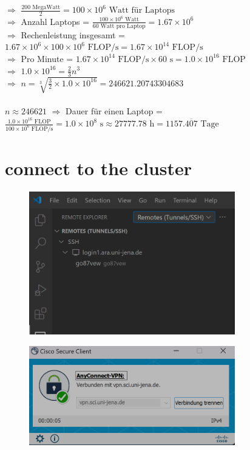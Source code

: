 \documentclass{article}
\begin{document}
$\Rightarrow$  $\frac{200 \text{ MegaWatt}}{2} = 100 \times 10^6 \text{ Watt für Laptops}$\\
$\Rightarrow$  Anzahl Laptops = $\frac{100 \times 10^6 \text{ Watt}}{60 \text{ Watt pro Laptop}} = 1.67 \times 10^6$\\
$\Rightarrow$  Rechenleistung insgesamt = $1.67 \times 10^6 \times 100 \times 10^6\text{ FLOP/s} = 1.67 \times 10^{14} \text{ FLOP/s}$\\
$\Rightarrow$  Pro Minute = $1.67 \times 10^{14} \text{ FLOP/s} \times 60 \text{ s} = 1.0 \times 10^{16} \text{ FLOP}$\\
$\Rightarrow$  $1.0 \times 10^{16} = \frac{2}{3}n^3$\\
$\Rightarrow$  $n = \sqrt[3]{\frac{3}{2} \times 1.0 \times 10^{16}} = 246621.20743304683$\\\\
$n \approx 246621$
$\Rightarrow$  Dauer für einen Laptop = $\frac{1.0 \times 10^{16} \text{ FLOP}}{100 \times 10^6 \text{ FLOP/s}} = 1.0 \times 10^8 \text{ s} \approx 27777.78 \text{ h} = 1157.\overline{407} \text{ Tage}$\\

\section{connect to the cluster}
\begin{figure}[H]
    \includegraphics[width=0.8\textwidth]{ssh.png}
\end{figure}

\begin{figure}[H]
    \includegraphics[width=0.8\textwidth]{cisco.png}
\end{figure}
\end{document}
